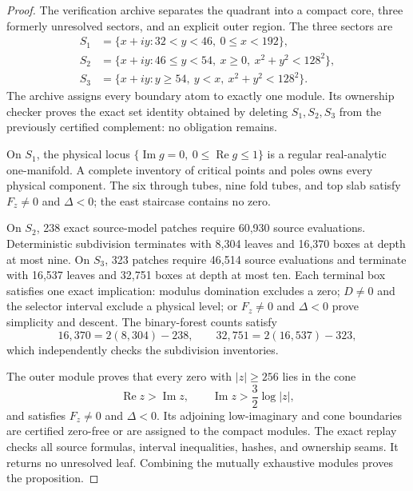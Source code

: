 \documentclass[11pt,a4paper]{amsart}
\theoremstyle{definition}
\theoremstyle{remark}
\begin{document}
\begin{proof}
The verification archive separates the quadrant into a compact core, three formerly unresolved sectors, and an explicit outer region.  The three sectors are
\begin{align*}
 S_1&=\{x+iy:32<y<46,\ 0\leq x<192\},\\
 S_2&=\{x+iy:46\leq y<54,\ x\geq0,\ x^2+y^2<128^2\},\\
 S_3&=\{x+iy:y\geq54,\ y<x,\ x^2+y^2<128^2\}.
\end{align*}
The archive assigns every boundary atom to exactly one module.  Its ownership
checker proves the exact set identity obtained by deleting $S_1,S_2,S_3$
from the previously certified complement: no obligation remains.

On $S_1$, the physical locus
$\{\operatorname{Im}g=0,\ 0\leq\operatorname{Re}g\leq1\}$ is a regular
real-analytic one-manifold.  A complete inventory of critical points and
poles owns every physical component.  The six through tubes, nine fold tubes,
and top slab satisfy $F_z\neq0$ and $\Delta<0$; the east staircase contains
no zero.

On $S_2$, 238 exact source-model patches require 60,930 source evaluations.
Deterministic subdivision terminates with 8,304 leaves and 16,370 boxes at
depth at most nine.  On $S_3$, 323 patches require 46,514 source evaluations
and terminate with 16,537 leaves and 32,751 boxes at depth at most ten.  Each
terminal box satisfies one exact implication: modulus domination excludes a
zero; $D\neq0$ and the selector interval exclude a physical level; or
$F_z\neq0$ and $\Delta<0$ prove simplicity and descent.  The binary-forest
counts satisfy
\[
  16{,}370=2(8{,}304)-238,
  \qquad
  32{,}751=2(16{,}537)-323,
\]
which independently checks the subdivision inventories.

The outer module proves that every zero with $|z|\geq256$ lies in the cone
\begin{equation}\label{eq:outer-cone}
  \operatorname{Re}z>\operatorname{Im}z,
  \qquad
  \operatorname{Im}z>\frac32\log|z|,
\end{equation}
and satisfies $F_z\neq0$ and $\Delta<0$.  Its adjoining low-imaginary and cone boundaries are certified zero-free or are assigned to the compact modules.  The exact replay checks all source formulas, interval inequalities, hashes, and ownership seams.  It returns no unresolved leaf.  Combining the mutually exhaustive modules proves the proposition.
\end{proof}
\end{document}
